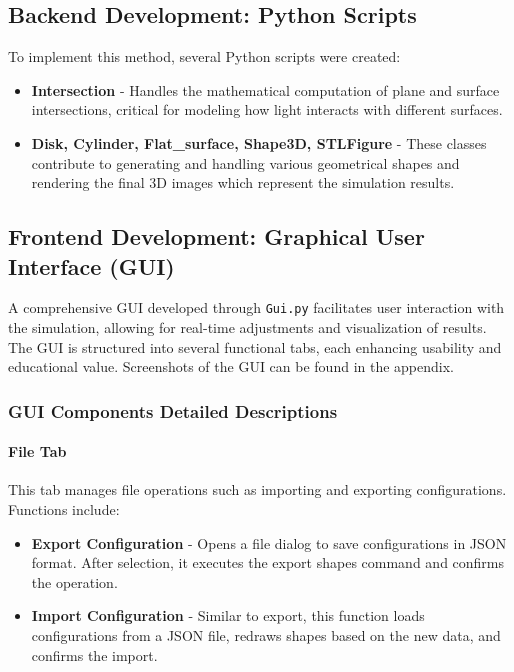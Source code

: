 \documentclass[../main.tex]{subfiles}
\begin{document}
\subsection{Backend Development: Python Scripts}
\vspace{-10pt}
To implement this method, several Python scripts were created:
\vspace{-4pt}
\begin{itemize}
    \setlength{\itemsep}{0.1mm}
    \item \textbf{Intersection} - Handles the mathematical computation of plane and surface intersections, critical for modeling how light interacts with different surfaces.
    \item \textbf{Disk, Cylinder, Flat\_surface, Shape3D, STLFigure} - These classes contribute to generating and handling various geometrical shapes and rendering the final 3D images which represent the simulation results.
\end{itemize}
\vspace{-15pt}
\subsection{Frontend Development: Graphical User Interface (GUI)}
\vspace{-15pt}
A comprehensive GUI developed through \texttt{Gui.py} facilitates user interaction with the simulation, allowing for real-time adjustments and visualization of results. The GUI is structured into several functional tabs, each enhancing usability and educational value. Screenshots of the GUI can be found in the appendix.
\vspace{-15pt}
\subsubsection{GUI Components Detailed Descriptions}
\vspace{-8pt}
\paragraph{File Tab}
This tab manages file operations such as importing and exporting configurations. Functions include:
\begin{itemize}
    \setlength{\itemsep}{0.1mm}
    \item \textbf{Export Configuration} - Opens a file dialog to save configurations in JSON format. After selection, it executes the export shapes command and confirms the operation.
    \item \textbf{Import Configuration} - Similar to export, this function loads configurations from a JSON file, redraws shapes based on the new data, and confirms the import.
\end{itemize}
\vspace{-15pt}
\end{document}
